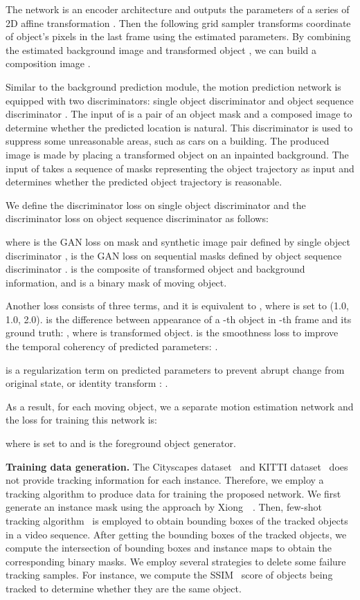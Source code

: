 \documentclass[10pt,twocolumn,letterpaper]{article}
\begin{document}
The network is an encoder architecture and outputs the parameters of a series of 2D affine transformation . 
Then the following grid sampler transforms coordinate of object's pixels in the last frame using the estimated parameters. By combining the estimated background image  and transformed object , we can build a composition image .


Similar to the background prediction module, the motion prediction network is equipped with two discriminators: single object discriminator  and object sequence discriminator .
The input of  is a pair of an object mask and a composed image to determine whether the predicted location is natural. This discriminator is used to suppress some unreasonable areas, such as cars on a building. The produced image is made by placing a transformed object on an inpainted background. The input of  takes a sequence of masks representing the object trajectory as input and determines whether the predicted object trajectory is reasonable.



We define the discriminator loss  on single object discriminator and the discriminator loss  on object sequence discriminator as follows:


where  is the GAN loss on mask and synthetic image pair defined by single object discriminator ,  is the GAN loss on sequential masks defined by object sequence discriminator .  is the composite of transformed object and background information, and  is a binary mask of moving object.

Another loss  consists of three terms, and it is equivalent to , where  is set to (1.0, 1.0, 2.0).
 is the  difference between appearance of a -th object in -th frame and its ground truth: 
, where  is transformed object. 
 is the smoothness loss to improve the temporal coherency of predicted parameters: .

 is a regularization term on predicted parameters to prevent abrupt change from original state, or identity transform :
.

As a result, for each moving object, we a separate motion estimation network and the loss for training this network is:

where  is set to  and  is the foreground object generator.

\vspace{2mm}
\noindent\textbf{Training data generation.}
The Cityscapes dataset~\cite{Cordts2016Cityscapes} and KITTI dataset~\cite{kitti} does not provide tracking information for each instance. Therefore, we employ a tracking algorithm to produce data for training the proposed network. We first generate an instance mask using the approach by Xiong~\etal~\cite{xiong19upsnet}. Then, few-shot tracking algorithm~\cite{li2018siamrpn++} is employed to obtain bounding boxes of the tracked objects in a video sequence. After getting the bounding boxes of the tracked objects, we compute the intersection of bounding boxes and instance maps to obtain the corresponding binary masks. We employ several strategies to delete some failure tracking samples. For instance, we compute the SSIM~\cite{ssim} score of objects being tracked to determine whether they are the same object.
\end{document}
